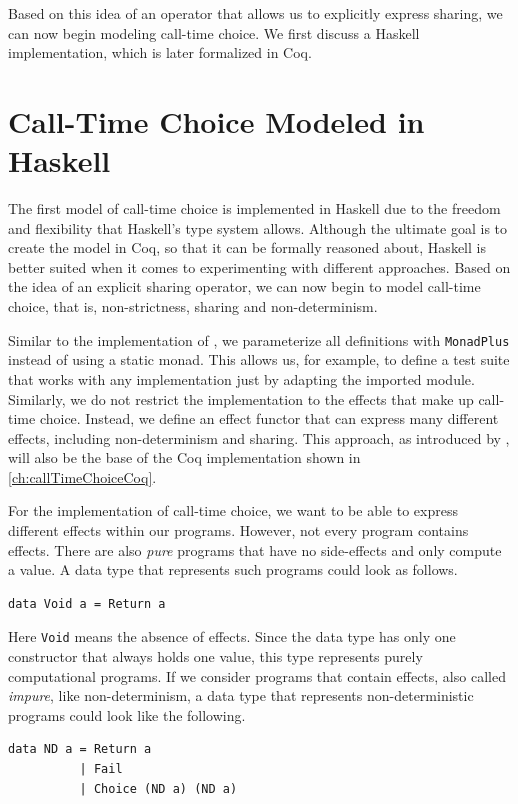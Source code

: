 \documentclass[a4paper, 11pt, fleqn, twoside]{scrreprt}
\newcommand{\hinl}[1]{\texttt{#1}}
\begin{document}
Based on this idea of an operator that allows us to explicitly express sharing, we can now begin modeling call-time choice.
We first discuss a Haskell implementation, which is later formalized in Coq.

\chapter{Call-Time Choice Modeled in Haskell}
\label{ch:callTimeChoiceHaskell}
The first model of call-time choice is implemented in Haskell due to the freedom and flexibility that Haskell's type system allows.
Although the ultimate goal is to create the model in Coq, so that it can be formally reasoned about, Haskell is better suited when it comes to experimenting with different approaches.
Based on the idea of an explicit sharing operator, we can now begin to model call-time choice, that is, non-strictness, sharing and non-determinism.

Similar to the implementation of \citet{fischer2009purely}, we parameterize all definitions with \hinl{MonadPlus} instead of using a static monad.
This allows us, for example, to define a test suite that works with any implementation just by adapting the imported module.
Similarly, we do not restrict the implementation to the effects that make up call-time choice.
Instead, we define an effect functor that can express many different effects, including non-determinism and sharing.
This approach, as introduced by \citet{wu2014effect}, will also be the base of the Coq implementation shown in \autoref{ch:callTimeChoiceCoq}.

For the implementation of call-time choice, we want to be able to express different effects within our programs.
However, not every program contains effects.
There are also \textit{pure} programs that have no side-effects and only compute a value.
A data type that represents such programs could look as follows.

\begin{verbatim}
data Void a = Return a
\end{verbatim}

Here \hinl{Void} means the absence of effects. Since the data type has only one constructor that always holds one value, this type represents purely computational programs.
If we consider programs that contain effects, also called \textit{impure}, like non-determinism, a data type that represents non-deterministic programs could look like the following.

\begin{verbatim}
data ND a = Return a
          | Fail
          | Choice (ND a) (ND a)
\end{verbatim}
\end{document}
